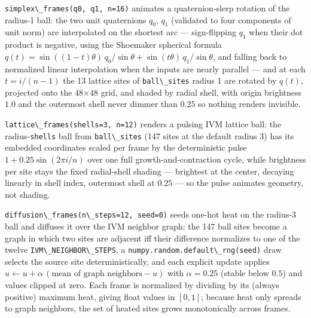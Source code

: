 \documentclass[
  10pt,
]{article}
\newcommand{\passthrough}[1]{#1}
\begin{document}
\passthrough{\lstinline!simplex\_frames(q0, q1, n=16)!} animates a
quaternion-slerp rotation of the radius-1 ball: the two unit quaternions
\(q_0\), \(q_1\) (validated to four components of unit norm) are
interpolated on the shortest arc --- sign-flipping \(q_1\) when their
dot product is negative, using the Shoemaker spherical formula
\(q(t) = \sin((1-t)\theta)\,q_0 / \sin\theta + \sin(t\theta)\,q_1 / \sin\theta\),
and falling back to normalized linear interpolation when the inputs are
nearly parallel --- and at each \(t = i/(n-1)\) the 13 lattice sites of
\passthrough{\lstinline!ball\_sites!} radius 1 are rotated by \(q(t)\),
projected onto the 48×48 grid, and shaded by radial shell, with origin
brightness \(1.0\) and the outermost shell never dimmer than \(0.25\) so
nothing renders invisible.

\passthrough{\lstinline!lattice\_frames(shells=3, n=12)!} renders a
pulsing IVM lattice ball: the radius-\passthrough{\lstinline!shells!}
ball from \passthrough{\lstinline!ball\_sites!} (147 sites at the
default radius 3) has its embedded coordinates scaled per frame by the
deterministic pulse \(1 + 0.25\sin(2\pi i/n)\) over one full
growth-and-contraction cycle, while brightness per site stays the fixed
radial-shell shading --- brightest at the center, decaying linearly in
shell index, outermost shell at \(0.25\) --- so the pulse animates
geometry, not shading.

\passthrough{\lstinline!diffusion\_frames(n\_steps=12, seed=0)!} seeds
one-hot heat on the radius-3 ball and diffuses it over the IVM neighbor
graph: the 147 ball sites become a graph in which two sites are adjacent
iff their difference normalizes to one of the twelve
\passthrough{\lstinline!IVM\_NEIGHBOR\_STEPS!}, a
\passthrough{\lstinline!numpy.random.default\_rng(seed)!} draw selects
the source site deterministically, and each explicit update applies
\(u \leftarrow u + \alpha\,(\text{mean of graph neighbors} - u)\) with
\(\alpha = 0.25\) (stable below \(0.5\)) and values clipped at zero.
Each frame is normalized by dividing by its (always positive) maximum
heat, giving float values in \([0, 1]\); because heat only spreads to
graph neighbors, the set of heated sites grows monotonically across
frames.
\end{document}
